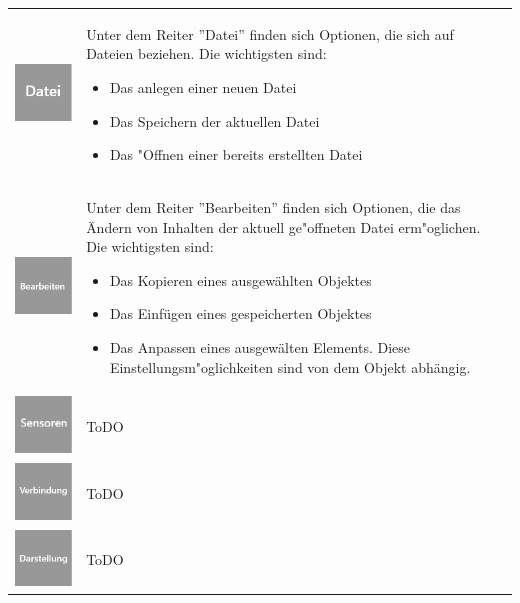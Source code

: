 \documentclass[parskip=full]{scrartcl}
\begin{document}
\begin{tabular}[t]{p{1cm} p{10cm}}
	\vspace{0cm}\includegraphics[width = 1 cm]{Grafik/Datei.jpg} & Unter dem Reiter ''Datei'' finden sich Optionen, die sich auf Dateien beziehen. Die wichtigsten sind: 
	\begin{itemize} 
		\item Das anlegen einer neuen Datei
		\item Das Speichern der aktuellen Datei
		\item Das "Offnen einer bereits erstellten Datei
	\end{itemize}\\
	\vspace{0cm}\includegraphics[width = 1 cm]{Grafik/Bearbeiten.jpg} & Unter dem Reiter ''Bearbeiten'' finden sich Optionen, die das Ändern von Inhalten der aktuell ge"offneten Datei erm"oglichen. Die wichtigsten sind:
	\begin{itemize} 
		\item Das Kopieren eines ausgewählten Objektes
		\item Das Einfügen eines gespeicherten Objektes
		\item Das Anpassen eines ausgewälten Elements. Diese Einstellungsm"oglichkeiten sind von dem Objekt abhängig.
	\end{itemize}\\
	\vspace{0cm}\includegraphics[width = 1 cm]{Grafik/Sensor.jpg} & ToDO\\
	\vspace{0cm}\includegraphics[width = 1 cm]{Grafik/Verbindung.jpg} & ToDO\\
	\vspace{0cm}\includegraphics[width = 1 cm]{Grafik/Dartstellung.jpg} & ToDO\\

\end{tabular}
\end{document}
